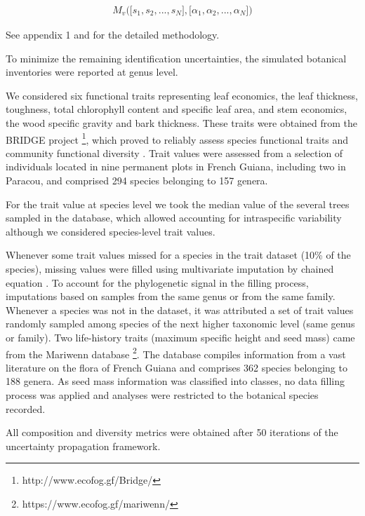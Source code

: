 \documentclass[fleqn,10pt]{ArtEcoFoG} %
\begin{document}
\begin{align}
M_v\Big(\big[s_1, s_2,..., s_N\big],\big[\alpha_1, \alpha_2,..., \alpha_N\big]\Big) \nonumber
\end{align}

See appendix 1 and \citet{Aubry-Kientz2013} for the detailed methodology.

To minimize the remaining identification uncertainties, the simulated botanical inventories were reported at genus level.

We considered six functional traits representing leaf economics, the leaf thickness, toughness, total chlorophyll content and specific leaf area, and stem economics, the wood specific gravity and bark thickness.
These traits were obtained from the BRIDGE project \footnote{http://www.ecofog.gf/Bridge/}, which proved to reliably assess species functional traits and community functional diversity \citep{Paine2015}.
Trait values were assessed from a selection of individuals located in nine permanent plots in French Guiana, including two in Paracou, and comprised 294 species belonging to 157 genera.

\color{red}

For the trait value at species level we took the median value of the several trees sampled in the database, which allowed accounting for intraspecific variability although we considered species-level trait values.
\color{black}

Whenever some trait values missed for a species in the trait dataset (10\% of the species), missing values were filled using multivariate imputation by chained equation \citep{Mice2011}.
To account for the phylogenetic signal in the filling process, imputations based on samples from the same genus or from the same family.
Whenever a species was not in the dataset, it was attributed a set of trait values randomly sampled among species of the next higher taxonomic level (same genus or family).
Two life-history traits (maximum specific height and seed mass) came from the Mariwenn database \footnote{https://www.ecofog.gf/mariwenn/}.
The database compiles information from a vast literature on the flora of French Guiana \citep{Ollivier2007} and comprises 362 species belonging to 188 genera.
As seed mass information was classified into classes, no data filling process was applied and analyses were restricted to the botanical species recorded.

All composition and diversity metrics were obtained after 50 iterations of the uncertainty propagation framework.
\end{document}
